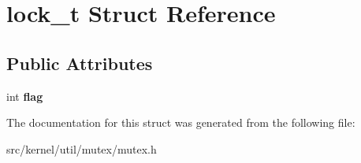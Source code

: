 \hypertarget{structlock__t}{}\section{lock\+\_\+t Struct Reference}
\label{structlock__t}
\subsection*{Public Attributes}
\begin{DoxyCompactItemize}
\item 
\mbox{\label{structlock__t_a795b473d834087dd24f90f0fcbcc5077}} 
int {\bfseries flag}
\end{DoxyCompactItemize}


The documentation for this struct was generated from the following file\+:\begin{DoxyCompactItemize}
\item 
src/kernel/util/mutex/mutex.\+h\end{DoxyCompactItemize}
